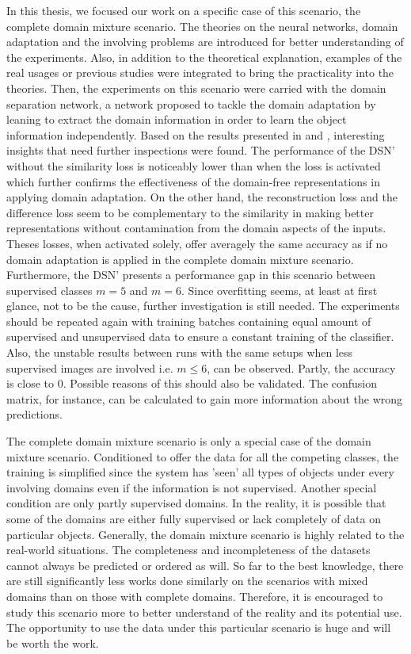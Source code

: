 In this thesis, we focused our work on a specific case of this scenario, the complete domain mixture scenario. The theories on the neural networks, domain adaptation and the involving problems are introduced for better understanding of the experiments. Also, in addition to the theoretical explanation, examples of the real usages or previous studies were integrated to bring the practicality into the theories. Then, the experiments on this scenario were carried with the domain separation network, a network proposed to tackle the domain adaptation by leaning to extract the domain information in order to learn the object information independently. Based on the results presented in \cite{DSN} and \cite{domainMixture}, interesting insights that need further inspections were found. The performance of the DSN' without the similarity loss is noticeably lower than when the loss is activated which further confirms the effectiveness of the domain-free representations in applying domain adaptation. On the other hand, the reconstruction loss and the difference loss seem to be complementary to the similarity in making better representations without contamination from the domain aspects of the inputs. Theses losses, when activated solely, offer averagely the same accuracy as if no domain adaptation is applied in the complete domain mixture scenario. Furthermore, the DSN' presents a performance gap in this scenario between supervised classes $m = 5$ and $m = 6$. Since overfitting seems, at least at first glance, not to be the cause, further investigation is still needed. The experiments should be repeated again with training batches containing equal amount of supervised and unsupervised data to ensure a constant training of the classifier. Also, the unstable results between runs with the same setups when less supervised images are involved i.e. $m \leq 6$, can be observed. Partly, the accuracy is close to 0. Possible reasons of this should also be validated. The confusion matrix, for instance, can be calculated to gain more information about the wrong predictions.

The complete domain mixture scenario is only a special case of the domain mixture scenario. Conditioned to offer the data for all the competing classes, the training is simplified since the system has 'seen' all types of objects under every involving domains even if the information is not supervised. Another special condition are only partly supervised domains. In the reality, it is possible that some of the domains are either fully supervised or lack completely of data on particular objects. Generally, the domain mixture scenario is highly related to the real-world situations. The completeness and incompleteness of the datasets cannot always be predicted or ordered as will. So far to the best knowledge, there are still significantly less works done similarly on the scenarios with mixed domains than on those with complete domains. Therefore, it is encouraged to study this scenario more to better understand of the reality and its potential use. The opportunity to use the data under this particular scenario is huge and will be worth the work. 